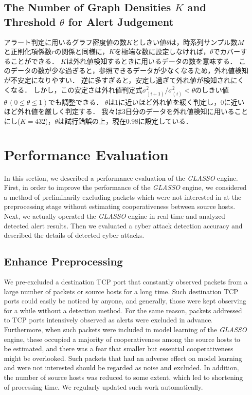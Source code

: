 \documentclass[conference]{IEEEtran}
\begin{document}
\subsection{The Number of Graph Densities $K$ and Threshold $\theta$ for Alert Judgement}
アラート判定に用いるグラフ密度値の数$K$としきい値$\theta$は，時系列サンプル数$M$と正則化項係数$r$の関係と同様に，$K$を極端な数に設定しなければ，$\theta$でカバーすることができる．
$K$は外れ値検知するときに用いるデータの数を意味する．
このデータの数が少な過ぎると，参照できるデータが少なくなるため，外れ値検知が不安定になりやすい．
逆に多すぎると，安定し過ぎて外れ値が検知されにくくなる．
しかし，この安定さは外れ値判定式$\sigma^{2}_{(i+1)}/\sigma^{2}_{(i)}<\theta$のしきい値$\theta \, (0\leq \theta \leq 1)$でも調整できる．
$\theta$は1に近いほど外れ値を緩く判定し，0に近いほど外れ値を厳しく判定する．
我々は3日分のデータを外れ値検知に用いることにし($K=432$)，$\theta$は試行錯誤の上，現在0.98に設定している．




\section{Performance Evaluation}
In this section, we described a performance evaluation of the {\it GLASSO} engine.
First, in order to improve the performance of the {\it GLASSO} engine, we considered a method of preliminarily excluding packets which were not interested in at the preprocessing stage without estimating cooperativeness between source hosts.
Next, we actually operated the {\it GLASSO} engine in real-time and analyzed detected alert results.
Then we evaluated a cyber attack detection accuracy and described the details of detected cyber attacks.


\subsection{Enhance Preprocessing}
We pre-excluded a destination TCP port that constantly observed packets from a large number of packets or source hosts for a long time.
Such destination TCP ports could easily be noticed by anyone, and generally, those were kept observing for a while without a detection method.
For the same reason, packets addressed to TCP ports intensively observed as alerts were excluded in advance.
Furthermore, when such packets were included in model learning of the {\it GLASSO} engine, these occupied a majority of cooperativeness among the source hosts to be estimated, and there was a fear that smaller but essential cooperativeness might be overlooked.
Such packets that had an adverse effect on model learning and were not interested should be regarded as noise and excluded.
In addition, the number of source hosts was reduced to some extent, which led to shortening of processing time.
We regularly updated such work automatically.
\end{document}
